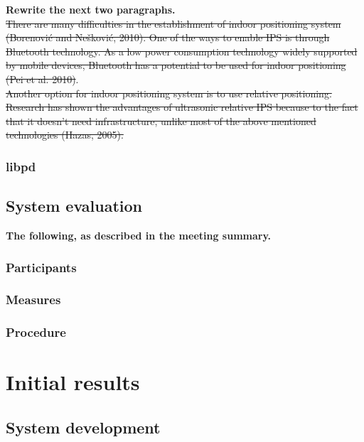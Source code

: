 \documentclass[a4paper,11pt]{article}
\begin{document}
\textbf{Rewrite the next two paragraphs.}\\

\st{There are many difficulties in the establishment of indoor positioning system (Borenović and Nešković, 2010). One of the ways to enable IPS is through Bluetooth technology. As a low power consumption technology widely supported by mobile devices, Bluetooth has a potential to be used for indoor positioning (Pei et al. 2010)}.\\

\st{Another option for indoor positioning system is to use relative positioning. Research has shown the advantages of ultrasonic relative IPS because to the fact that it doesn’t need infrastructure, unlike most of the above mentioned technologies (Hazas, 2005).}\\


\subsubsection{libpd}


\subsection{System evaluation}


\textbf{The following, as described in the meeting summary.}\\


\subsubsection{Participants}


\subsubsection{Measures}


\subsubsection{Procedure}


\section{Initial results}


\subsection{System development}
\end{document}
